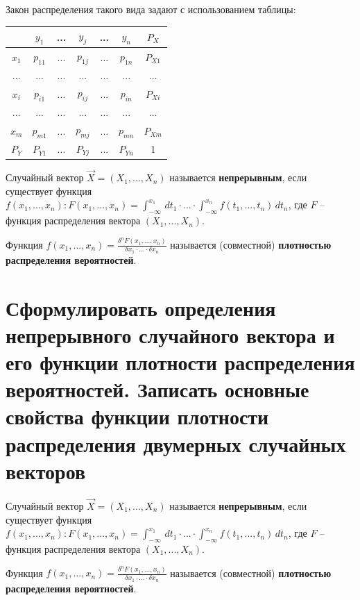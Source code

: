 Закон распределения такого вида задают с использованием таблицы:

\begin{tabular}{|c|c|c|c|c|c|c|}
	\hline
	  & $y_1$ & ... & $y_j$ & ... & $y_n$ & $P_X$ \\ \hline
	$x_1$ & $p_{11}$ & ... & $p_{1j}$ & ... & $p_{1n}$ & $P_{X1}$ \\ \hline
	... & ... & ... & ... & ... & ... & ... \\ \hline
	$x_i$ & $p_{i1}$ & ... & $p_{ij}$ & ... & $p_{in}$ & $P_{Xi}$ \\ \hline
	... & ... & ... & ... & ... & ... & ... \\ \hline
	$x_m$ & $p_{m1}$ & ... & $p_{mj}$ & ... & $p_{mn}$ & $P_{Xm}$ \\ \hline
	$P_Y$ & $P_{Y1}$ & ... & $P_{Yj}$ & ... & $P_{Yn}$ & 1 \\ \hline
\end{tabular}

Случайный вектор $\vec{X} = (X_1, ..., X_n)$ называется \textbf{непрерывным}, если существует функция $f(x_1, ..., x_n): F(x_1, ..., x_n) = \int_{-\infty}^{x_1} \, dt_1 \cdot ... \cdot \int_{-\infty}^{x_n} f(t_1, ..., t_n) \, dt_n$, где $F$ -- функция распределения вектора $(X_1, ..., X_n)$.

Функция $f(x_1, ..., x_n) = \frac {\delta^n F(x_1, ..., x_n)}{\delta x_1 \cdot ... \cdot \delta x_n}$ называется (совместной) \textbf{плотностью распределения вероятностей}.

\section{Сформулировать определения непрерывного случайного вектора и его функции плотности распределения вероятностей. Записать основные свойства функции плотности распределения двумерных случайных векторов}

Случайный вектор $\vec{X} = (X_1, ..., X_n)$ называется \textbf{непрерывным}, если существует функция $f(x_1, ..., x_n): F(x_1, ..., x_n) = \int_{-\infty}^{x_1} \, dt_1 \cdot ... \cdot \int_{-\infty}^{x_n} f(t_1, ..., t_n) \, dt_n$, где $F$ -- функция распределения вектора $(X_1, ..., X_n)$.

Функция $f(x_1, ..., x_n) = \frac {\delta^n F(x_1, ..., x_n)}{\delta x_1 \cdot ... \cdot \delta x_n}$ называется (совместной) \textbf{плотностью распределения вероятностей}.

